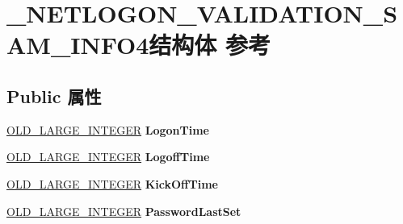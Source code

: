 \hypertarget{struct___n_e_t_l_o_g_o_n___v_a_l_i_d_a_t_i_o_n___s_a_m___i_n_f_o4}{}\section{\+\_\+\+N\+E\+T\+L\+O\+G\+O\+N\+\_\+\+V\+A\+L\+I\+D\+A\+T\+I\+O\+N\+\_\+\+S\+A\+M\+\_\+\+I\+N\+F\+O4结构体 参考}
\label{struct___n_e_t_l_o_g_o_n___v_a_l_i_d_a_t_i_o_n___s_a_m___i_n_f_o4}
\subsection*{Public 属性}
\begin{DoxyCompactItemize}
\item 
\mbox{\label{struct___n_e_t_l_o_g_o_n___v_a_l_i_d_a_t_i_o_n___s_a_m___i_n_f_o4_a961b9ad279f234046f5332469720d449}} 
\hyperlink{struct___o_l_d___l_a_r_g_e___i_n_t_e_g_e_r}{O\+L\+D\+\_\+\+L\+A\+R\+G\+E\+\_\+\+I\+N\+T\+E\+G\+ER} {\bfseries Logon\+Time}
\item 
\mbox{\label{struct___n_e_t_l_o_g_o_n___v_a_l_i_d_a_t_i_o_n___s_a_m___i_n_f_o4_ac693d62b8b303269ad2cb2eba256bb50}} 
\hyperlink{struct___o_l_d___l_a_r_g_e___i_n_t_e_g_e_r}{O\+L\+D\+\_\+\+L\+A\+R\+G\+E\+\_\+\+I\+N\+T\+E\+G\+ER} {\bfseries Logoff\+Time}
\item 
\mbox{\label{struct___n_e_t_l_o_g_o_n___v_a_l_i_d_a_t_i_o_n___s_a_m___i_n_f_o4_a9ee0f050d662cbb0139b52b869a15d26}} 
\hyperlink{struct___o_l_d___l_a_r_g_e___i_n_t_e_g_e_r}{O\+L\+D\+\_\+\+L\+A\+R\+G\+E\+\_\+\+I\+N\+T\+E\+G\+ER} {\bfseries Kick\+Off\+Time}
\item 
\mbox{\label{struct___n_e_t_l_o_g_o_n___v_a_l_i_d_a_t_i_o_n___s_a_m___i_n_f_o4_ab02ca9149707ebd475c9843d4dddf5f1}} 
\hyperlink{struct___o_l_d___l_a_r_g_e___i_n_t_e_g_e_r}{O\+L\+D\+\_\+\+L\+A\+R\+G\+E\+\_\+\+I\+N\+T\+E\+G\+ER} {\bfseries Password\+Last\+Set}
\item 

\end{DoxyCompactItemize}
